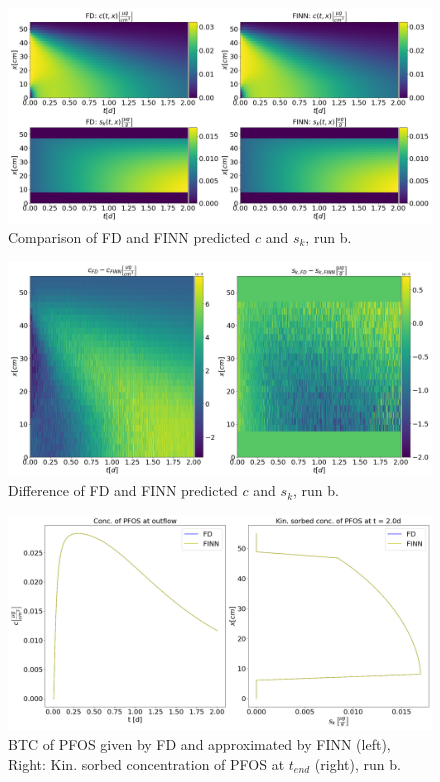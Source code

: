 \begin{figure}
    \centering
    \includegraphics[scale=0.3]{images/res_ov_synt_pf.png}
    \caption[Comparison of FD and FINN solution, run b]{Comparison of FD and FINN predicted $c$ and $s_k$, run b.}
    \label{fig:res_ov_synt_pf}
\end{figure}
\begin{figure}
    \centering
    \includegraphics[scale=0.3]{images/res_diff_synt_pf.png}
    \caption[Difference FD and FINN solution, run b]{Difference of FD and FINN predicted $c$ and $s_k$, run b.}
    \label{fig:res_diff_synt_pf}
\end{figure}
\begin{figure}
    \centering
    \includegraphics[scale=0.3]{images/res_btc_synt_pf.png}
    \caption[Comparison of FD and FINN BTCs, run b]{BTC of PFOS given by FD and approximated by FINN (left), Right: Kin. sorbed concentration of PFOS at $t_{end}$ (right), run b.}
    \label{fig:res_btc_synt_pf}
\end{figure}
